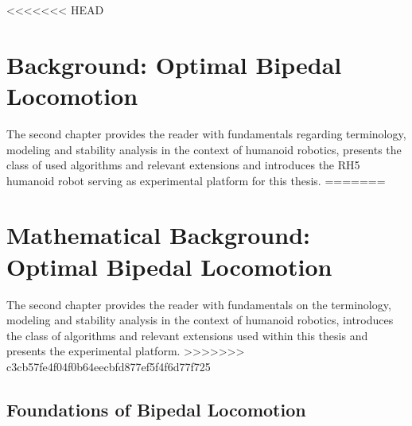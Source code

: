 
<<<<<<< HEAD
\chapter{Background: Optimal Bipedal Locomotion}\label{c2}
The second chapter provides the reader with fundamentals regarding terminology, modeling and stability analysis in the context of humanoid robotics, presents the class of used algorithms and relevant extensions and introduces the RH5 humanoid robot serving as experimental platform for this thesis.
=======
\chapter{Mathematical Background: Optimal Bipedal Locomotion}\label{c2}
The second chapter provides the reader with fundamentals on the terminology, modeling and stability analysis in the context of humanoid robotics, introduces the class of algorithms and relevant extensions used within this thesis and presents the experimental platform.  
>>>>>>> c3cb57fe4f04f0b64eecbfd877ef5f4f6d77f725

\section{Foundations of Bipedal Locomotion}
